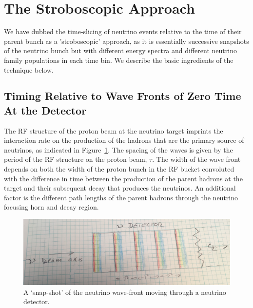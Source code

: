 %
%
\section{The Stroboscopic Approach}
\label{approach}
We have dubbed the time-slicing of neutrino events relative to the
time of their parent bunch as a 'stroboscopic' approach, as it is
essentially successive snapshots of the neutrino bunch but with
different energy spectra and different neutrino family populations in
each time bin. We describe the basic ingredients of the technique
below.

\subsection{Timing Relative to Wave Fronts of Zero Time At the Detector}
\label{wave_front}

The RF structure of the proton beam at the neutrino target imprints
the interaction rate on the production of the hadrons that are the
primary source of neutrinos, as indicated in
Figure~\ref{fig:wave_fronts}. The spacing of the waves is given by the
period of the RF structure on the proton beam, $\tau$. The width of
the wave front depends on both the width of the proton bunch in the RF
bucket convoluted with the difference in time between the
production of the parent hadrons  at the target and their subsequent
decay that produces the neutrinos. An additional factor is the
different path lengths of the parent hadrons through the neutrino
focusing horn and decay region. 

\begin{figure}[ht]
	\begin{center}
           	\includegraphics[width=1.0 \linewidth]{Figures/nupaper_waves_IMG_5834_crop.jpg}
	\end{center}
	\caption{A `snap-shot' of the neutrino wave-front moving
          through a neutrino detector.}

	\label{fig:wave_fronts}
\end{figure}



